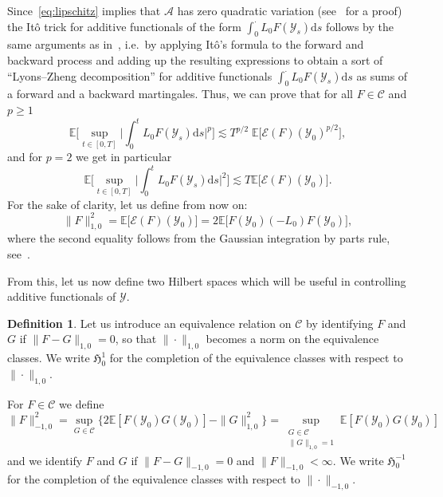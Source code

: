 \documentclass[10pt]{amsart}
\theoremstyle{definition}\newtheorem{defi}[theo]{Definition}\newtheorem{rema}[theo]{Remark}\newtheorem{exam}[theo]{Example}\newtheorem{exem}[theo]{Example}\newtheorem{nota}[theo]{Notation}
\newcommand{\mc}[1]{{\mathcal #1}}
\renewcommand{\mc}[1]{{\mathcal #1}}
\newcommand*{\dd}{\mathrm{d}}
\newcommand*{\ds}{\dd s}
\begin{document}
Since~\eqref{eq:lipschitz} implies that $\mc A$ has zero quadratic variation (see~\cite[Proposition~4]{GJSi} for a proof) the It\^o trick for additive functionals of the form $\int_0^{\cdot} L_0 F (\mc Y_s) \ds$ follows by the same arguments as in~\cite[Proposition~3.2]{Gubinelli2015Energy}, i.e.~by applying It\^o's formula to the forward and backward process and adding up the resulting expressions to obtain a sort of ``Lyons--Zheng decomposition'' for additive functionals $\int_0^\cdot L_0 F(\mc Y_s) \ds$ as sums of a forward and a backward martingales. Thus, we can prove that for all $F \in \mathcal{C}$ and $p\geqslant 1$
\begin{equation}\label{eq:ito-bound-cylinder}
\mathbb{E} \bigg[\sup_{t \in [0, T]} \bigg|
\int_0^t L_0 F (\mc Y_s) \ds \bigg|^p \bigg] \lesssim T^{p / 2} \;
\mathbb{E} \big[\mathcal{E} (F) (\mc Y_0)^{p / 2}\big],
\end{equation}
and for $p = 2$ we get in particular
\begin{equation}\label{eq:ito-bound-cylinder-1-norm}
\mathbb{E} \bigg[\sup_{t \in [0, T]}
\bigg| \int_0^t L_0 F (\mc Y_s) \ds \bigg|^2 \bigg]\lesssim T \mathbb{E} \big[\mathcal{E} (F) (\mc Y_0)\big].
\end{equation}
For the sake of clarity, let us define from now on:
\[
\| F
\|_{1,0}^2 = \mathbb{E} \big[\mathcal{E} (F) (\mc Y_0)\big]=2\mathbb{E} \big[F (\mc Y_0) (- L_0) F (\mc Y_0)\big],
\]
where the second equality follows from the Gaussian integration by parts rule, see~\cite[Lemma~1.2.1]{Nualart2006}.


From this, let us now define two Hilbert spaces which will be useful in controlling additive functionals of $\mc Y$.

\begin{defi}
Let us introduce an equivalence relation on $\mathcal{C}$ by identifying $F$ and $G$ if $\|F - G\|_{1,0} = 0$, so that $\| \cdot \|_{1,0}$ becomes a norm on the equivalence classes. We write $\mathfrak{H}^1_0$ for the completion of the equivalence classes with respect to $\| \cdot \|_{1,0}$.

For $F \in \mc C$ we define
\[
\| F \|_{- 1,0}^2 = \sup_{G \in \mathcal{C}} \big\{ 2\mathbb{E} [F (\mc Y_0) G (\mc Y_0)] - \| G \|_{1,0}^2 \big\} = \sup_{\substack{G \in \mathcal{C}\\ \|G \|_{1,0} = 1}} \mathbb{E} [F (\mc Y_0) G (\mc Y_0)]
\]
and we identify $F$ and $G$ if $\| F - G \|_{- 1,0} = 0$ and $\| F \|_{- 1,0} <
\infty$. We write $\mathfrak{H}_0^{- 1}$ for the completion of the equivalence classes with respect to $\| \cdot \|_{- 1,0}$.
\end{defi}
\end{document}
